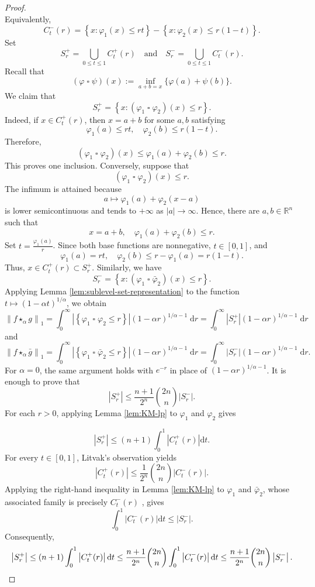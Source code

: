 \documentclass[11pt]{amsart}
\theoremstyle{plain}
\theoremstyle{definition}
\theoremstyle{remark}
\begin{document}
\begin{proof}
\[    \]
    Equivalently,
    $$
    C_t^{-}(r)=\left\{x: \varphi_1(x) \leq r t\right\}-\left\{x: \varphi_2(x) \leq r(1-t)\right\} .
    $$
    Set
    \[
        S_r^+ = \bigcup_{0 \leq t \leq 1} C_t^+(r) \quad \text{and} \quad S_r^- = \bigcup_{0 \leq t \leq 1} C_t^-(r).
    \]
    Recall that
    $$
    (\varphi \mathbin\square \psi)(x):=\inf _{a+b=x}\{\varphi(a)+\psi(b)\}.
    $$
    We claim that
    \[
        S_r^+  =\left\{x:\left(\varphi_1 \mathbin\square \varphi_2\right)(x) \leq r\right\}.
    \]
    Indeed, if $x \in C_t^{+}(r)$, then $x=a+b$ for some $a, b$ satisfying
$$
\varphi_1(a) \leq r t, \quad \varphi_2(b) \leq r(1-t) .
$$
Therefore,
$$
\left(\varphi_1 \mathbin\square \varphi_2\right)(x) \leq \varphi_1(a)+\varphi_2(b) \leq r .
$$
This proves one inclusion. Conversely, suppose that
$$
\left(\varphi_1 \mathbin\square \varphi_2\right)(x) \leq r .
$$
The infimum is attained because
$$
a \longmapsto \varphi_1(a)+\varphi_2(x-a)
$$
is lower semicontinuous and tends to $+\infty$ as $|a| \to \infty$. Hence, there are $a, b \in \mathbb{R}^n$ such that
$$
x=a+b, \quad \varphi_1(a)+\varphi_2(b) \leq r .
$$
Set $ t = \frac{\varphi_1(a)}{r}$. Since both base functions are nonnegative, $t \in[0,1]$, and
$$
\varphi_1(a)=r t, \quad \varphi_2(b) \leq r-\varphi_1(a)=r(1-t) .
$$
Thus, $x \in C_t^{+}(r) \subset S_r^+$. Similarly, we have
    \[
        S_r^- = \left\{x:\left(\varphi_1 \mathbin\square \bar \varphi_2\right)(x) \leq r\right\}.
    \]
    Applying Lemma \ref{lem:sublevel-set-representation} to the function $t \mapsto (1-\alpha t)^{1 / \alpha} $, we obtain
    $$
\left\|f \star_\alpha g\right\|_1=\int_0^{\infty}\left|\left\{\varphi_1 \mathbin\square \varphi_2 \leq r\right\}\right|(1-\alpha r)^{1 / \alpha-1} \;\mathrm{d} r=\int_0^{\infty}\left|S_r^+\right|(1-\alpha r)^{1 / \alpha-1} \;\mathrm{d} r
$$
and
$$
\left\|f \star_\alpha \bar{g}\right\|_1=\int_0^{\infty}\left|\left\{\varphi_1 \mathbin\square \bar{\varphi}_2 \leq r\right\}\right|(1-\alpha r)^{1 / \alpha-1} \;\mathrm{d} r=\int_0^{\infty}\left|S_r^{-}\right|(1-\alpha r)^{1 / \alpha-1} \;\mathrm{d} r.
$$
For $\alpha=0$, the same argument holds with $e^{-r}$ in place of $(1-\alpha r)^{1 / \alpha-1}$.
It is enough to prove that
\begin{equation}
    |S_r^+| \leq  \frac{n+1}{2^n}\binom{2 n}{n} |S_r^-|.
\end{equation}
    For each $r>0$, applying Lemma \ref{lem:KM-lp} to $\varphi_1$ and $\varphi_2$ gives

$$
\left|S_r^{+}\right| \leq(n+1) \int_0^1\left|C_t^{+}(r)\right| \mathrm{d} t .
$$
For every $t \in[0,1]$, Litvak's observation yields
$$
\left|C_t^{+}(r)\right| \leq \frac{1}{2^n}\binom{2 n}{n}\left|C_t^{-}(r)\right| .
$$
Applying the right-hand inequality in Lemma \ref{lem:KM-lp} to $\varphi_1$ and $\bar{\varphi}_2$, whose associated family is precisely $C_t^{-}(r)$ , gives
$$
\int_0^1\left|C_t^{-}(r)\right| \mathrm{d} t \leq\left|S_r^{-}\right| .
$$
Consequently,
\[
\left|S_r^{+}\right| \leq(n+1) \int_0^1\left|C_t^{+}(r)\right| \mathrm{d} t \leq \frac{n+1}{2^n}\binom{2 n}{n} \int_0^1\left|C_t^{-}(r)\right| \mathrm{d} t
\leq \frac{n+1}{2^n}\binom{2 n}{n}\left|S_r^{-}\right| . \qedhere
\]
\end{proof}
\end{document}
